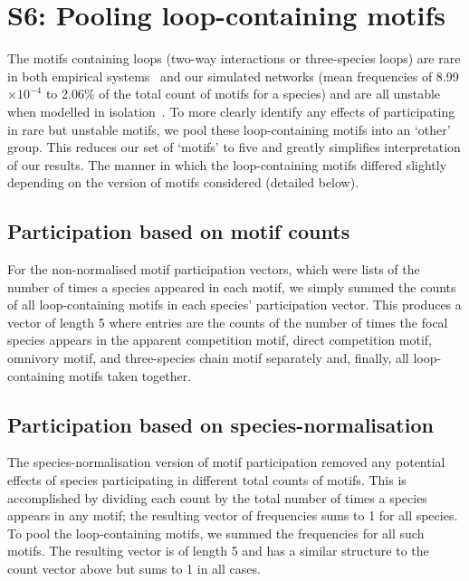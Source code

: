 \documentclass[12pt]{article}
\begin{document}
\clearpage

\section*{S6: Pooling loop-containing motifs} 
	
	The motifs containing loops (two-way interactions or three-species loops) are rare in both empirical systems~\citep{Stouffer2007} and our simulated networks (mean frequencies of 8.99$\times10^{-4}$ to 2.06\% of the total count of motifs for a species) and are all unstable when modelled in isolation~\citep{Borrelli2015a}.
	To more clearly identify any effects of participating in rare but unstable motifs, we pool these loop-containing motifs into an `other' group.
	This reduces our set of `motifs' to five and greatly simplifies interpretation of our results.
	The manner in which the loop-containing motifs differed slightly depending on the version of motifs considered (detailed below).


	\subsection*{Participation based on motif counts}

		For the non-normalised motif participation vectors, which were lists of the number of times a species appeared in each motif, we simply summed the counts of all loop-containing motifs in each species' participation vector.
		This produces a vector of length 5 where entries are the counts of the number of times the focal species appears in the apparent competition motif, direct competition motif, omnivory motif, and three-species chain motif separately and, finally, all loop-containing motifs taken together.


	\subsection*{Participation based on species-normalisation}

		The species-normalisation version of motif participation removed any potential effects of species participating in different total counts of motifs.
		This is accomplished by dividing each count by the total number of times a species appears in any motif; the resulting vector of frequencies sums to 1 for all species.
		To pool the loop-containing motifs, we summed the frequencies for all such motifs.
		The resulting vector is of length 5 and has a similar structure to the count vector above but sums to 1 in all cases.
\end{document}
